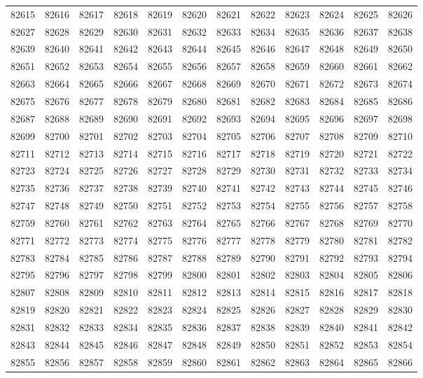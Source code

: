 \begin{center}
\begin{longtable}{llllllllllll}
82615 &82616 &82617 &82618 &82619 &82620 &82621 &82622 &82623 &82624 &82625 &82626 \\
82627 &82628 &82629 &82630 &82631 &82632 &82633 &82634 &82635 &82636 &82637 &82638 \\
82639 &82640 &82641 &82642 &82643 &82644 &82645 &82646 &82647 &82648 &82649 &82650 \\
82651 &82652 &82653 &82654 &82655 &82656 &82657 &82658 &82659 &82660 &82661 &82662 \\
82663 &82664 &82665 &82666 &82667 &82668 &82669 &82670 &82671 &82672 &82673 &82674 \\
82675 &82676 &82677 &82678 &82679 &82680 &82681 &82682 &82683 &82684 &82685 &82686 \\
82687 &82688 &82689 &82690 &82691 &82692 &82693 &82694 &82695 &82696 &82697 &82698 \\
82699 &82700 &82701 &82702 &82703 &82704 &82705 &82706 &82707 &82708 &82709 &82710 \\
82711 &82712 &82713 &82714 &82715 &82716 &82717 &82718 &82719 &82720 &82721 &82722 \\
82723 &82724 &82725 &82726 &82727 &82728 &82729 &82730 &82731 &82732 &82733 &82734 \\
82735 &82736 &82737 &82738 &82739 &82740 &82741 &82742 &82743 &82744 &82745 &82746 \\
82747 &82748 &82749 &82750 &82751 &82752 &82753 &82754 &82755 &82756 &82757 &82758 \\
82759 &82760 &82761 &82762 &82763 &82764 &82765 &82766 &82767 &82768 &82769 &82770 \\
82771 &82772 &82773 &82774 &82775 &82776 &82777 &82778 &82779 &82780 &82781 &82782 \\
82783 &82784 &82785 &82786 &82787 &82788 &82789 &82790 &82791 &82792 &82793 &82794 \\
82795 &82796 &82797 &82798 &82799 &82800 &82801 &82802 &82803 &82804 &82805 &82806 \\
82807 &82808 &82809 &82810 &82811 &82812 &82813 &82814 &82815 &82816 &82817 &82818 \\
82819 &82820 &82821 &82822 &82823 &82824 &82825 &82826 &82827 &82828 &82829 &82830 \\
82831 &82832 &82833 &82834 &82835 &82836 &82837 &82838 &82839 &82840 &82841 &82842 \\
82843 &82844 &82845 &82846 &82847 &82848 &82849 &82850 &82851 &82852 &82853 &82854 \\
82855 &82856 &82857 &82858 &82859 &82860 &82861 &82862 &82863 &82864 &82865 &82866 \\

\end{longtable}
\end{center}
